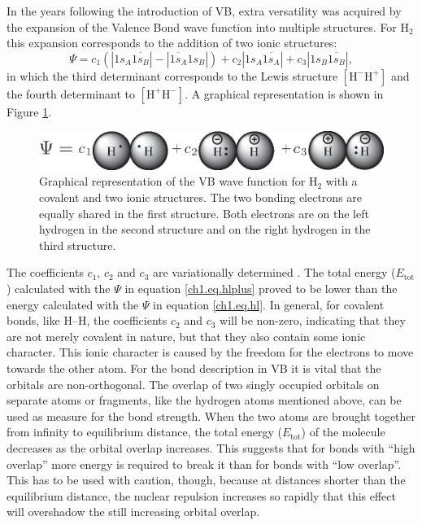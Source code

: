 In the years following the introduction of VB, extra versatility was acquired by the expansion of the Valence Bond wave function into multiple structures. For H$_2$ this expansion corresponds to the addition of two ionic structures:
\begin{equation}
\Psi = c_1 (|1s_{A}\overline{1s_{B}}| - |\overline{1s_{A}}1s_{B}|) + c_2 |1s_{A}\overline{1s_{A}}| + c_3 |1s_{B}\overline{1s_{B}}|,
\label{ch1.eq.hlplus}
\end{equation}
in which the third determinant corresponds to the Lewis structure $\mathrm{[H^{-} H^{+}]}$ and the fourth determinant to $\mathrm{[H^{+} H^{-}]}$. A graphical representation is shown in Figure \ref{ch1.fig.heitlerplus}.
\begin{figure}[htdp]
\center
\includegraphics[scale=1]{introduction/figures/heitlerplus.eps}
\caption{Graphical representation of the VB wave function for $\mathrm{H_2}$ with a covalent and two ionic structures. The two bonding electrons are equally shared in the first structure. Both electrons are on the left hydrogen in the second structure and on the right hydrogen in the third structure.}
\label{ch1.fig.heitlerplus}   
\end{figure}
The coefficients $c_1$, $c_2$ and $c_3$ are variationally determined \cite{varia}. The total energy ($E_\mathrm{tot}$) calculated with the $\Psi$ in equation \ref{ch1.eq.hlplus} proved to be lower than the energy calculated with the $\Psi$ in equation \ref{ch1.eq.hl}. In general, for covalent bonds, like H--H, the coefficients $c_2$ and $c_3$ will be non-zero, indicating that they are not merely covalent in nature, but that they also contain some ionic character. This ionic character is caused by the freedom for the electrons to move towards the other atom. For the bond description in VB it is vital that the orbitals are non-orthogonal. The overlap of two singly occupied orbitals on separate atoms or fragments, like the hydrogen atoms mentioned above, can be used as measure for the bond strength. When the two atoms are brought together from infinity to equilibrium distance, the total energy ($E_\mathrm{tot}$) of the molecule decreases as the orbital overlap increases. This suggests that for bonds with ``high overlap'' more energy is required to break it than for bonds with ``low overlap''. This has to be used with caution, though, because at distances shorter than the equilibrium distance, the nuclear repulsion increases so rapidly that this effect will overshadow the still increasing orbital overlap.

